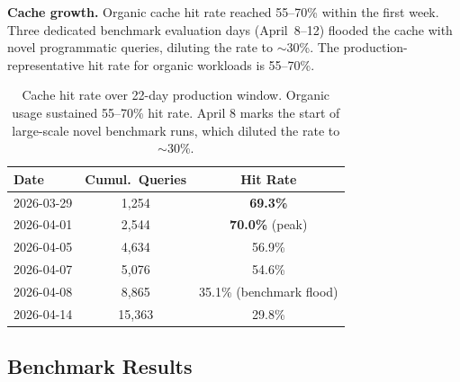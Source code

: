 \documentclass[11pt]{article}
\begin{document}
\textbf{Cache growth.} Organic cache hit rate reached 55--70\% within
the first week. Three dedicated benchmark evaluation days (April~8--12)
flooded the cache with novel programmatic queries, diluting the rate to
$\sim$30\%. The production-representative hit rate for organic workloads
is 55--70\%.

\begin{table}[t]
\centering
\small
\begin{tabular}{lcc}
\toprule
\textbf{Date} & \textbf{Cumul.\ Queries} & \textbf{Hit Rate} \\
\midrule
2026-03-29 & 1,254 & \textbf{69.3\%} \\
2026-04-01 & 2,544 & \textbf{70.0\%} (peak) \\
2026-04-05 & 4,634 & 56.9\% \\
2026-04-07 & 5,076 & 54.6\% \\
2026-04-08 & 8,865 & 35.1\% (benchmark flood) \\
2026-04-14 & 15,363 & 29.8\% \\
\bottomrule
\end{tabular}
\caption{Cache hit rate over 22-day production window. Organic usage
sustained 55--70\% hit rate. April 8 marks the start of large-scale
novel benchmark runs, which diluted the rate to $\sim$30\%.}
\label{tab:cachegrowth}
\end{table}

\subsection{Benchmark Results}
\label{sec:benchmarks}
\end{document}
